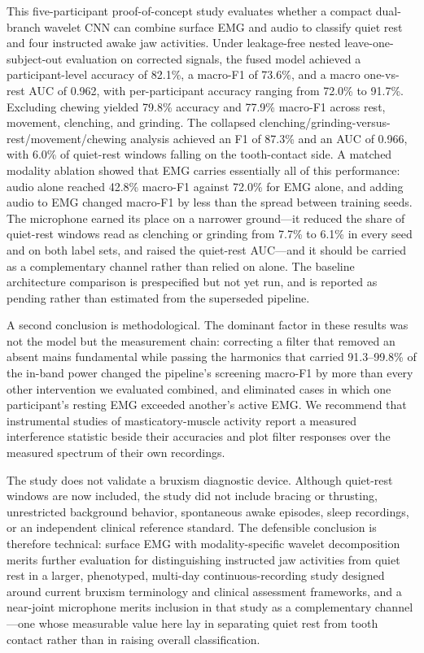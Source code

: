 \documentclass[pdflatex,sn-nature,iicol]{sn-jnl}
\begin{document}
This five-participant proof-of-concept study evaluates whether a compact dual-branch wavelet CNN can combine surface EMG and audio to classify quiet rest and four instructed awake jaw activities. Under leakage-free nested leave-one-subject-out evaluation on corrected signals, the fused model achieved a participant-level accuracy of 82.1\%, a macro-F1 of 73.6\%, and a macro one-vs-rest AUC of 0.962, with per-participant accuracy ranging from 72.0\% to 91.7\%. Excluding chewing yielded 79.8\% accuracy and 77.9\% macro-F1 across rest, movement, clenching, and grinding. The collapsed clenching/grinding-versus-rest/movement/chewing analysis achieved an F1 of 87.3\% and an AUC of 0.966, with 6.0\% of quiet-rest windows falling on the tooth-contact side. A matched modality ablation showed that EMG carries essentially all of this performance: audio alone reached 42.8\% macro-F1 against 72.0\% for EMG alone, and adding audio to EMG changed macro-F1 by less than the spread between training seeds. The microphone earned its place on a narrower ground---it reduced the share of quiet-rest windows read as clenching or grinding from 7.7\% to 6.1\% in every seed and on both label sets, and raised the quiet-rest AUC---and it should be carried as a complementary channel rather than relied on alone. The baseline architecture comparison is prespecified but not yet run, and is reported as pending rather than estimated from the superseded pipeline.

A second conclusion is methodological. The dominant factor in these results was not the model but the measurement chain: correcting a filter that removed an absent mains fundamental while passing the harmonics that carried 91.3--99.8\% of the in-band power changed the pipeline's screening macro-F1 by more than every other intervention we evaluated combined, and eliminated cases in which one participant's resting EMG exceeded another's active EMG. We recommend that instrumental studies of masticatory-muscle activity report a measured interference statistic beside their accuracies and plot filter responses over the measured spectrum of their own recordings.

The study does not validate a bruxism diagnostic device. Although quiet-rest windows are now included, the study did not include bracing or thrusting, unrestricted background behavior, spontaneous awake episodes, sleep recordings, or an independent clinical reference standard. The defensible conclusion is therefore technical: surface EMG with modality-specific wavelet decomposition merits further evaluation for distinguishing instructed jaw activities from quiet rest in a larger, phenotyped, multi-day continuous-recording study designed around current bruxism terminology and clinical assessment frameworks, and a near-joint microphone merits inclusion in that study as a complementary channel---one whose measurable value here lay in separating quiet rest from tooth contact rather than in raising overall classification.
\end{document}
